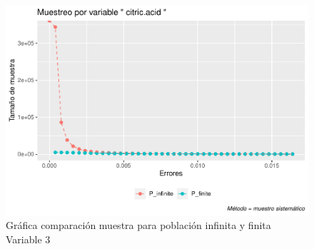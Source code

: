 \documentclass[
]{article}
\begin{document}
\begin{figure}
\centering
\includegraphics{1_examen_solucion_files/figure-latex/grafica sys3-1.pdf}
\caption{Gráfica comparación muestra para población infinita y finita
Variable 3}
\end{figure}
\end{document}
